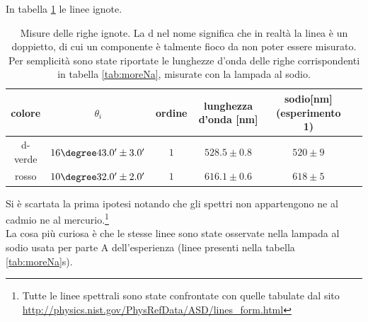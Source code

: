 \documentclass[a4paper,10pt]{article}
\begin{document}
{{{{{{{In tabella \ref{tab:Cur} le linee ignote.


\begin{table}[H]
\centering
\begin{tabular}{c|c|c|c|c|c}
colore & $\theta_i$ & ordine & lunghezza d'onda [nm] & sodio[nm](esperimento 1) \\
\hline
d-verde&  $ 16\degree 43.0' \pm 3.0 ' $   &  $ 1 $ & $ 528.5 \pm 0.8 $  & $520 \pm 9$\\
rosso  &  $ 10\degree 32.0' \pm 2.0 ' $  &  $ 1 $ & $ 616.1 \pm 0.6 $ & $ 618 \pm 5 $\\
\end{tabular}
\caption{Misure delle righe ignote. La d nel nome significa che in realtà la linea è un doppietto, di cui un componente è talmente fioco da non poter essere misurato. Per semplicità sono state riportate le lunghezze d'onda delle righe corrispondenti in tabella \ref{tab:moreNa}, misurate con la lampada al sodio.}
\label{tab:Cur}
\end{table}

Si è scartata la prima ipotesi notando che gli spettri non appartengono ne al cadmio ne al mercurio.\footnote{Tutte le linee spettrali sono state confrontate con quelle tabulate dal sito \url{http://physics.nist.gov/PhysRefData/ASD/lines_form.html}}\\


La cosa più curiosa è che le stesse linee sono state osservate nella lampada al sodio usata per parte A dell'esperienza (linee presenti nella tabella \ref{tab:moreNa}s).

}}}}}}}
\end{document}
